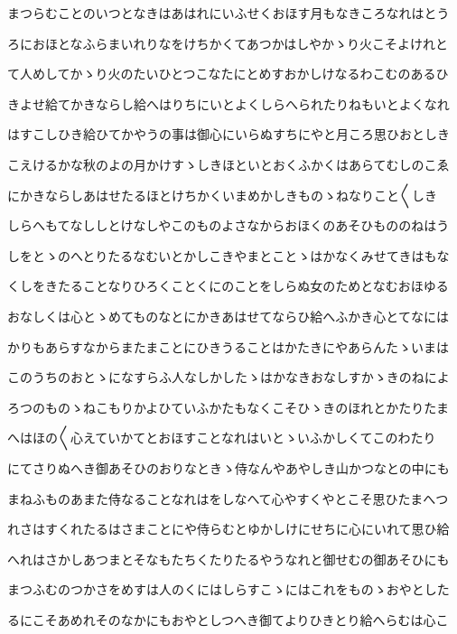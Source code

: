 \documentclass[a4paper,11pt,landscape]{ltjtarticle}
\begin{document}
\par\medskip
まつらむことのいつとなきはあはれにいふせくおほす月もなきころなれはとう
\par\medskip
ろにおほとなふらまいれりなをけちかくてあつかはしやかゝり火こそよけれと
\par\medskip
て人めしてかゝり火のたいひとつこなたにとめすおかしけなるわこむのあるひ
\par\medskip
きよせ給てかきならし給へはりちにいとよくしらへられたりねもいとよくなれ
\par\medskip
はすこしひき給ひてかやうの事は御心にいらぬすちにやと月ころ思ひおとしき
\par\medskip
こえけるかな秋のよの月かけすゝしきほといとおくふかくはあらてむしのこゑ
\par\medskip
にかきならしあはせたるほとけちかくいまめかしきものゝねなりこと〱しき
\par\medskip
しらへもてなししとけなしやこのものよさなからおほくのあそひもののねはう
\par\medskip
しをとゝのへとりたるなむいとかしこきやまとことゝはかなくみせてきはもな
\par\medskip
くしをきたることなりひろくことくにのことをしらぬ女のためとなむおほゆる
\par\medskip
おなしくは心とゝめてものなとにかきあはせてならひ給へふかき心とてなには
\par\medskip
かりもあらすなからまたまことにひきうることはかたきにやあらんたゝいまは
\par\medskip
このうちのおとゝになすらふ人なしかしたゝはかなきおなしすかゝきのねによ
\par\medskip
ろつのものゝねこもりかよひていふかたもなくこそひゝきのほれとかたりたま
\par\medskip
へはほの〱心えていかてとおほすことなれはいとゝいふかしくてこのわたり
\par\medskip
にてさりぬへき御あそひのおりなときゝ侍なんやあやしき山かつなとの中にも
\par\medskip
まねふものあまた侍なることなれはをしなへて心やすくやとこそ思ひたまへつ
\par\medskip
れさはすくれたるはさまことにや侍らむとゆかしけにせちに心にいれて思ひ給
\par\medskip
へれはさかしあつまとそなもたちくたりたるやうなれと御せむの御あそひにも
\par\medskip
まつふむのつかさをめすは人のくにはしらすこゝにはこれをものゝおやとした
\par\medskip
るにこそあめれそのなかにもおやとしつへき御てよりひきとり給へらむは心こ
\end{document}
